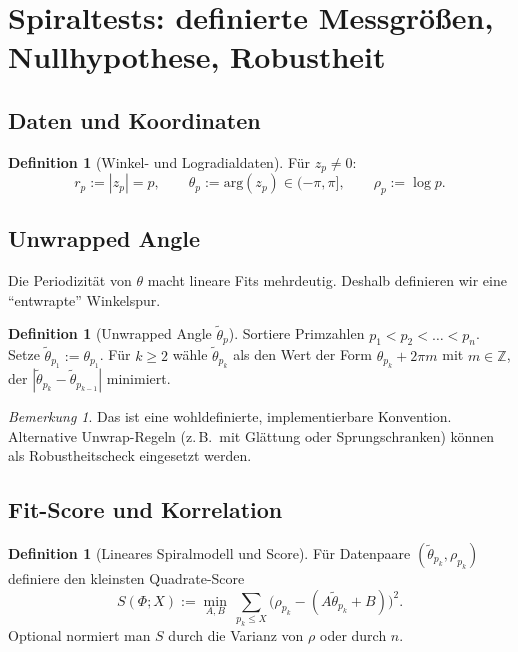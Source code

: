 \documentclass[a4paper,11pt]{article}
\theoremstyle{definition}
\newtheorem{definition}[satz]{Definition}
\theoremstyle{remark}
\newtheorem{bemerkung}[satz]{Bemerkung}
\newcommand{\Z}{\mathbb{Z}}
\newcommand{\Arg}{\mathrm{arg}}
\newcommand{\abs}[1]{\left|#1\right|}
\begin{document}
	\section{Spiraltests: definierte Messgrößen, Nullhypothese, Robustheit}
	\subsection{Daten und Koordinaten}
	\begin{definition}[Winkel- und Logradialdaten]
		Für \(z_p\neq 0\):
		\[
		r_p:=|z_p|=p,\qquad \theta_p:=\Arg(z_p)\in(-\pi,\pi],\qquad \rho_p:=\log p.
		\]
	\end{definition}
	
	\subsection{Unwrapped Angle}
	Die Periodizität von \(\theta\) macht lineare Fits mehrdeutig. Deshalb definieren wir eine ``entwrapte'' Winkelspur.
	
	\begin{definition}[Unwrapped Angle \(\widetilde{\theta}_p\)]
		Sortiere Primzahlen \(p_1<p_2<\dots<p_n\). Setze \(\widetilde{\theta}_{p_1}:=\theta_{p_1}\).
		Für \(k\ge 2\) wähle \(\widetilde{\theta}_{p_k}\) als den Wert der Form \(\theta_{p_k}+2\pi m\) mit \(m\in\Z\),
		der \(\abs{\widetilde{\theta}_{p_k}-\widetilde{\theta}_{p_{k-1}}}\) minimiert.
	\end{definition}
	
	\begin{bemerkung}
		Das ist eine wohldefinierte, implementierbare Konvention. Alternative Unwrap-Regeln (z.\,B.\ mit Glättung oder
		Sprungschranken) können als Robustheitscheck eingesetzt werden.
	\end{bemerkung}
	
	\subsection{Fit-Score und Korrelation}
	\begin{definition}[Lineares Spiralmodell und Score]
		Für Datenpaare \((\widetilde{\theta}_{p_k},\rho_{p_k})\) definiere den kleinsten Quadrate-Score
		\[
		S(\Phi;X):=\min_{A,B}\ \sum_{p_k\le X}\big(\rho_{p_k}-(A\widetilde{\theta}_{p_k}+B)\big)^2.
		\]
		Optional normiert man \(S\) durch die Varianz von \(\rho\) oder durch \(n\).
	\end{definition}
	
\end{document}
